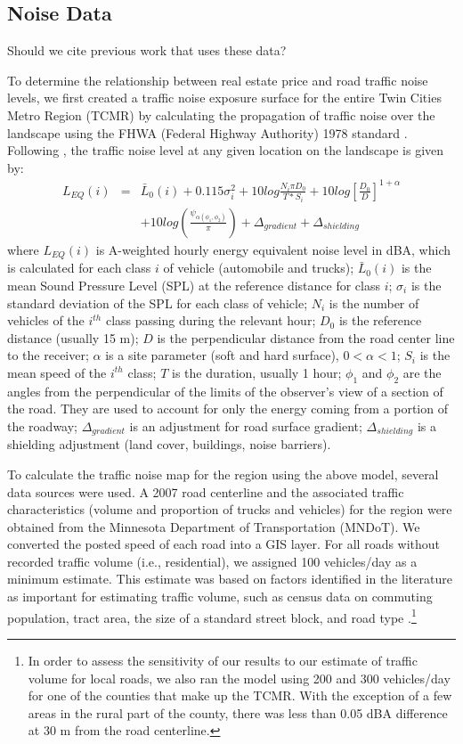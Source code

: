 \documentclass{article}\usepackage{graphicx, color}
\begin{document}
\subsection{Noise Data}
Should we cite previous work that uses these data?

To determine the relationship between real estate price and road traffic noise levels, we first created a traffic noise exposure surface for the entire Twin Cities Metro Region (TCMR) by calculating the propagation of traffic noise over the landscape using the FHWA (Federal Highway Authority) 1978 standard \citep{Barry1978}. Following \citet{Barry1978}, the traffic noise level at any given location on the landscape is given by: 
\begin{eqnarray}\label{eq:noise}
L_{EQ}(i) &=& \bar{L}_0(i) + 0.115 \sigma _i^2 + 10 log \frac{N_i \pi D_0}{T*S_i} + 10 log \left[ \frac{D_0}{D}\right]^{1 + \alpha}  \nonumber \\
&& + 10 log \left( \frac{\psi _{\alpha (\phi _1, \phi _2)}}{\pi}\right) + \Delta _{gradient} + \Delta _{shielding}
\end{eqnarray}
where $L_{EQ}(i)$ is A-weighted hourly energy equivalent noise level in dBA, which is calculated for each class $i$ of vehicle (automobile and trucks); $\bar{L}_0(i)$ is the mean Sound Pressure Level (SPL) at the reference distance for class $i$; $\sigma _i$ is the standard deviation of the SPL for each class of vehicle; $N_i$ is the number of vehicles of the $i^{th}$ class passing during the relevant hour; $D_0$ is the reference distance (usually 15 m); $D$ is the perpendicular distance from the road center line to the receiver; $\alpha$ is a site parameter (soft and hard surface), $0 < \alpha < 1$; $S_i$ is the mean speed of the $i^{th}$ class; $T$ is the duration, usually 1 hour; $\phi _1$ and $\phi _2$ are the angles from the perpendicular of the limits of the observer's view of a section of the road. They are used to account for only the energy coming from a portion of the roadway; $\Delta _{gradient}$ is an adjustment for road surface gradient; $\Delta _{shielding}$ is a shielding adjustment (land cover, buildings, noise barriers).

To calculate the traffic noise map for the region using the above model, several data sources were used. A 2007 road centerline and the associated traffic characteristics (volume and proportion of trucks and vehicles) for the region were obtained from the Minnesota Department of Transportation (MNDoT). We converted the posted speed of each road into a GIS layer. For all roads without recorded traffic volume (i.e., residential), we assigned 100 vehicles/day as a minimum estimate. This estimate was based on factors identified in the literature as important for estimating traffic volume, such as census data on commuting population, tract area, the size of a standard street block, and road type \citep{Cheng1992, Fricker1986}.\footnote{In order to assess the sensitivity of our results to our estimate of traffic volume for local roads, we also ran the model using 200 and 300 vehicles/day for one of the counties that make up the TCMR. With the exception of a few areas in the rural part of the county, there was less than 0.05 dBA difference at 30 m from the road centerline.}
\end{document}

